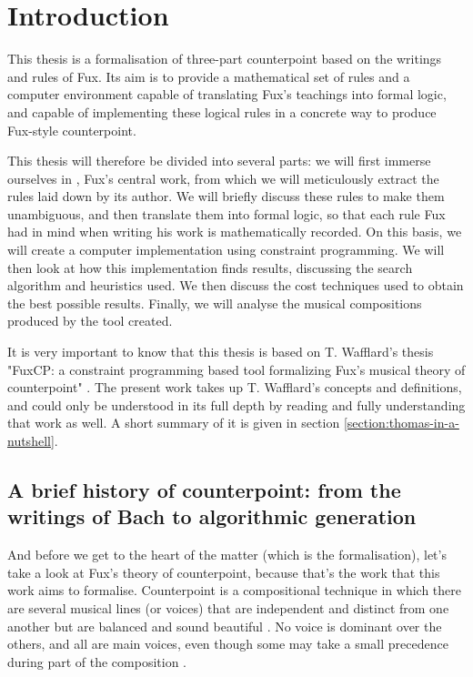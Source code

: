 \chapter{Introduction}
This thesis is a formalisation of three-part counterpoint based on the writings and rules of Fux. Its aim is to provide a mathematical set of rules and a computer environment capable of translating Fux's teachings into formal logic, and capable of implementing these logical rules in a concrete way to produce Fux-style counterpoint.


This thesis will therefore be divided into several parts: we will first immerse ourselves in \gap, Fux's central work, from which we will meticulously extract the rules laid down by its author. We will briefly discuss these rules to make them unambiguous, and then translate them into formal logic, so that each rule Fux had in mind when writing his work is mathematically recorded. On this basis, we will create a computer implementation using constraint programming. We will then look at how this implementation finds results, discussing the search algorithm and heuristics used. We then discuss the cost techniques used to obtain the best possible results. Finally, we will analyse the musical compositions produced by the tool created.

It is very important to know that this thesis is based on T. Wafflard's thesis "FuxCP: a constraint programming based tool formalizing Fux's musical theory of counterpoint" \cite{wafflard2023}. The present work takes up T. Wafflard's concepts and definitions, and could only be understood in its full depth by reading and fully understanding that work as well. A short summary of it is given in section \ref{section:thomas-in-a-nutshell}.



\section{A brief history of counterpoint: from the writings of Bach to algorithmic generation}
And before we get to the heart of the matter (which is the formalisation), let's take a look at Fux's theory of counterpoint, because that's the work that this work aims to formalise. Counterpoint is a compositional technique in which there are several musical lines (or voices) that are independent and distinct from one another but are balanced and sound beautiful \cite{CpSachs}. No voice is dominant over the others, and all are main voices, even though some may take a small precedence during part of the composition \cite{hess2016}.  


